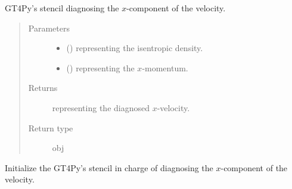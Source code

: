 \documentclass[letterpaper,10pt,english]{sphinxmanual}
\begin{document}
\begin{fulllineitems}
\begin{fulllineitems}
\end{fulllineitems}


\begin{fulllineitems}
\label{\detokenize{api:dycore.diagnostic_isentropic.DiagnosticIsentropic._stencil_diagnosing_velocity_x_defs}}
GT4Py’s stencil diagnosing the \(x\)-component of the velocity.
\begin{quote}\begin{description}
\item[{Parameters}] \leavevmode\begin{itemize}
\item {} 
 () \textendash{}  representing the isentropic density.

\item {} 
 () \textendash{}  representing the \(x\)-momentum.

\end{itemize}

\item[{Returns}] \leavevmode
{} representing the diagnosed \(x\)-velocity.

\item[{Return type}] \leavevmode
obj

\end{description}\end{quote}

\end{fulllineitems}


\begin{fulllineitems}
\label{\detokenize{api:dycore.diagnostic_isentropic.DiagnosticIsentropic._stencil_diagnosing_velocity_x_initialize}}
Initialize the GT4Py’s stencil in charge of diagnosing the \(x\)-component of the velocity.

\end{fulllineitems}


\end{fulllineitems}
\end{document}
